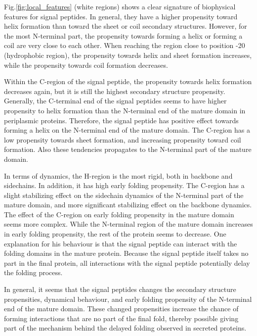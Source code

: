 Fig.\ref{fig:local_features} (white regions) shows a clear signature of biophysical features for signal peptides.
In general, they have a higher propensity toward helix formation than toward the sheet or coil secondary structures.
However, for the most N-terminal part, the propensity towards forming a helix or forming a coil are very close to each other.
When reaching the region  close to position -20 (hydrophobic region), the propensity towards helix and sheet formation increases,
while the propensity towards coil formation decreases.

Within the C-region of the signal peptide, the propensity towards helix formation decreases again, 
but it is still the highest secondary structure propensity.
Generally, the C-terminal end of the signal peptides 
seems to have higher propensity to helix formation than the N-terminal end of the mature domain in periplasmic proteins.
Therefore, the signal peptide has positive effect towards forming a helix on the N-terminal end of the mature domain.
The C-region has a low propensity towards sheet formation,
and increasing propensity toward coil formation.
Also these tendencies propagates to the N-terminal part of the mature domain.  

In terms of dynamics, 
the H-region is the most rigid, both in backbone and sidechains.
In addition, it has high early folding propensity.
The C-region has a slight stabilizing effect on the sidechain dynamics of the N-terminal part of the mature domain,
and more significant stabilizing effect on the backbone dynamics.
The effect of the C-region on early folding propensity in the mature domain seems more complex.
While the N-terminal region of the mature domain increases in early folding propensity,
the rest of the protein seems to decrease.
One explanation for his behaviour is that the signal peptide can interact with the folding domains in the mature protein.
Because the signal peptide itself takes no part in the final protein,
all interactions with the signal peptide potentially delay the folding process.

In general, 
it seems that the signal peptides changes the secondary structure propensities, dynamical behaviour,
and early folding propensity of the N-terminal end of the mature domain.
These changed propensities increase the chance of forming interactions that are no part of the final fold,
thereby possible giving part of the mechanism behind the delayed folding observed in secreted proteins.
